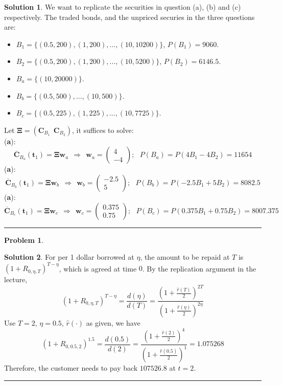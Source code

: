 \documentclass[a4paper, 10pt]{article}
\theoremstyle{definition}
\newtheorem{problem}{Problem}
\theoremstyle{hSol}
\newtheorem*{solution}{Solution}
\begin{document}
\begin{solution} We want to replicate the securities in question (a), (b) and (c) respectively. The traded bonds, and the unpriced securies in the three questions are:
\begin{itemize}
  \item[] $B_1 = \{(0.5, 200), (1, 200), ..., (10, 10200)\}$, $P(B_1)=9060$. 
  \item[] $B_2 = \{(0.5, 200), (1, 200), ..., (10, 5200)\}$, $P(B_2)=6146.5$.
  \item[] $B_a = \{(10, 20000)\}$.
  \item[] $B_b = \{(0.5, 500), ..., (10, 500)\}$.
  \item[] $B_c = \{(0.5, 225), (1, 225), ..., (10, 7725)\}$.
\end{itemize}
Let $\bm{\Xi} = (\bm{C}_{B_1}~~\bm{C}_{B_2})$, it suffices to solve:\\
(\textbf{a}):
$$
\overline{\bm{C}}_{B_{a}}(\bm{t}_1) = \bm{\Xi} \bm{w}_a ~~\Rightarrow~~ \bm{w}_a = \begin{pmatrix}
  4 \\
  -4
\end{pmatrix};~~~P(B_a) = P(4B_1 - 4B_2) = 11654
$$
(\textbf{a}):
$$
\overline{\bm{C}}_{B_{b}}(\bm{t}_1) = \bm{\Xi} \bm{w}_b ~~\Rightarrow~~ \bm{w}_b = \begin{pmatrix}
  -2.5 \\
  5
\end{pmatrix};~~~P(B_b) = P(-2.5B_1 + 5B_2) = 8082.5
$$
(\textbf{a}):
$$
\overline{\bm{C}}_{B_{c}}(\bm{t}_1) = \bm{\Xi} \bm{w}_c ~~\Rightarrow~~ \bm{w}_c = \begin{pmatrix}
  0.375 \\
  0.75
\end{pmatrix};~~~P(B_c) = P(0.375B_1 + 0.75B_2) = 8007.375
$$
\end{solution}


\noindent\rule{16cm}{0.4pt}

\begin{problem} 
\end{problem}
\begin{solution} For per 1 dollar borrowed at $\eta$, the amount to be repaid at $T$ is $(1+R_{0, \eta, T})^{T-\eta}$, which is agreed at time $0$. By the replication argument in the lecture,
$$
(1+R_{0, \eta, T})^{T-\eta} = \frac{d(\eta)}{d(T)} = \frac{(1+\frac{\hat{r}(T)}{2})^{2T}}{(1+\frac{\hat{r}(\eta)}{2})^{2\eta}}
$$
Use $T=2$, $\eta=0.5$, $\hat{r}(\cdot)$ as given, we have
$$
(1+R_{0, 0.5, 2})^{1.5} = \frac{d(0.5)}{d(2)} = \frac{(1+\frac{\hat{r}(2)}{2})^{4}}{(1+\frac{\hat{r}(0.5)}{2})^{1}} = 1.075268
$$
Therefore, the customer needs to pay back $107526.8$ at $t=2$.
\end{solution}
\noindent\rule{16cm}{0.4pt}
\end{document}
